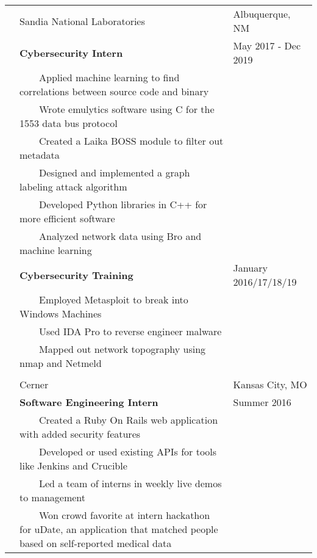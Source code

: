 \documentclass[10.5pt, arial]{article}
\newcommand{\tabitem}{~~\llap{\textbullet}~~}
\begin{document}
\begin{longtable}{p{1.5cm} p{13.2cm} l}
            & Sandia National Laboratories	& Albuquerque, NM 		\\
			& \textbf{Cybersecurity Intern}										& May 2017 - Dec 2019 	\\
			& \tabitem Applied machine learning to find correlations between source code and binary & 	\\
			& \tabitem Wrote emulytics software using C for the 1553 data bus protocol 	&			\\
			& \tabitem Created a Laika BOSS module to filter out metadata		&						\\
            & \tabitem Designed and implemented a graph labeling attack algorithm 	&     				\\
            & \tabitem Developed Python libraries in C++ for more efficient software 	& 				\\
            & \tabitem Analyzed network data using Bro and machine learning 			& 				\\
            & \textbf{Cybersecurity Training} 									& January 2016/17/18/19 \\
			& \tabitem Employed Metasploit to break into Windows Machines		&	 					\\
			& \tabitem Used IDA Pro to reverse engineer malware 				& 						\\
			& \tabitem Mapped out network topography using nmap and Netmeld		&						\\ \\
\pagebreak
			& Cerner 															& Kansas City, MO 		\\
			& \textbf{Software Engineering Intern} 								& Summer 2016			\\
			& \tabitem Created a Ruby On Rails web application with added security features	& 			\\
			& \tabitem Developed or used existing APIs for tools like Jenkins and Crucible	& 			\\
			& \tabitem Led a team of interns in weekly live demos to management 			&    		\\
            & \tabitem Won crowd favorite at intern hackathon for uDate, an application that matched people based on self-reported medical data   &                       \\
\end{longtable}
\end{document}
